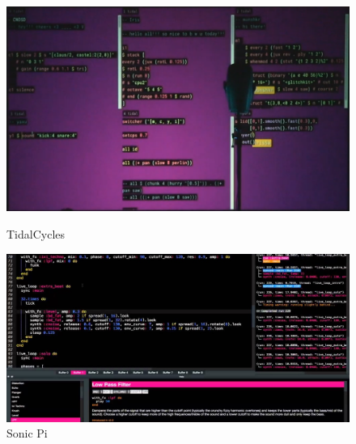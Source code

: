 \begin{figure}[h]
  \begin{minipage}[b]{0.45\linewidth}
    \centering
    \includegraphics[width=\linewidth]{images/experiments/tidal00.png}
    \caption{TidalCycles}
    \label{tidal00}
  \end{minipage}
  \hspace{0.1\linewidth} %
  \begin{minipage}[b]{0.45\linewidth}
    \centering
    \includegraphics[width=\linewidth]{images/experiments/sonicpi00.jpg}
    \caption{Sonic Pi}
    \label{sonicpi00}
  \end{minipage}
\end{figure}

